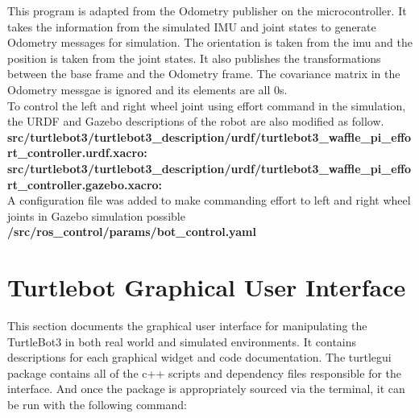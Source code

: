 \documentclass[12]{article}
\begin{document}


This program is adapted from the Odometry publisher on the microcontroller. It takes the information from the simulated IMU and joint states to generate Odometry messages
for simulation. The orientation is taken from the imu and the position is taken from the joint states. It also publishes the transformations between the
base frame and the Odometry frame. The covariance matrix in the Odometry messgae is ignored and its elements are all 0s. \\

To control the left and right wheel joint using effort command in the simulation, the URDF and Gazebo descriptions of the robot are also modified as follow. \\

\textbf{src/turtlebot3/turtlebot3\_description/urdf/turtlebot3\_waffle\_pi\_effort\_controller.urdf.xacro:} \\


\textbf{src/turtlebot3/turtlebot3\_description/urdf/turtlebot3\_waffle\_pi\_effort\_controller.gazebo.xacro:} \\



A configuration file was added to make commanding effort to left and right wheel joints in Gazebo simulation possible\\
\textbf{/src/ros\_control/params/bot\_control.yaml} \\

\section{Turtlebot Graphical User Interface}
This section documents the graphical user interface for manipulating the TurtleBot3 in both real world and simulated environments. It contains descriptions for each graphical widget and code documentation. The turtlegui package contains all of the c++ scripts and dependency files responsible for the interface. And once the package is appropriately sourced via the terminal, it can be run with the following command:\\
\end{document}
